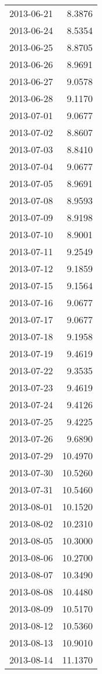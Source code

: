 \begin{tabular}{lr}
2013-06-21 &      8.3876 \\
2013-06-24 &      8.5354 \\
2013-06-25 &      8.8705 \\
2013-06-26 &      8.9691 \\
2013-06-27 &      9.0578 \\
2013-06-28 &      9.1170 \\
2013-07-01 &      9.0677 \\
2013-07-02 &      8.8607 \\
2013-07-03 &      8.8410 \\
2013-07-04 &      9.0677 \\
2013-07-05 &      8.9691 \\
2013-07-08 &      8.9593 \\
2013-07-09 &      8.9198 \\
2013-07-10 &      8.9001 \\
2013-07-11 &      9.2549 \\
2013-07-12 &      9.1859 \\
2013-07-15 &      9.1564 \\
2013-07-16 &      9.0677 \\
2013-07-17 &      9.0677 \\
2013-07-18 &      9.1958 \\
2013-07-19 &      9.4619 \\
2013-07-22 &      9.3535 \\
2013-07-23 &      9.4619 \\
2013-07-24 &      9.4126 \\
2013-07-25 &      9.4225 \\
2013-07-26 &      9.6890 \\
2013-07-29 &     10.4970 \\
2013-07-30 &     10.5260 \\
2013-07-31 &     10.5460 \\
2013-08-01 &     10.1520 \\
2013-08-02 &     10.2310 \\
2013-08-05 &     10.3000 \\
2013-08-06 &     10.2700 \\
2013-08-07 &     10.3490 \\
2013-08-08 &     10.4480 \\
2013-08-09 &     10.5170 \\
2013-08-12 &     10.5360 \\
2013-08-13 &     10.9010 \\
2013-08-14 &     11.1370 \\

\end{tabular}
